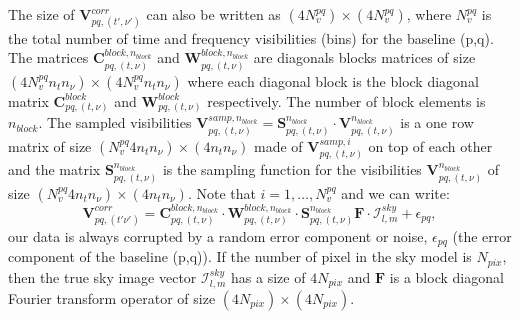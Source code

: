 \documentclass[useAMS,usenatbib]{mn2e}
\begin{document}
The size of 
$\mathbf{V}_{pq,(t',\nu')}^{corr}$ can also be written as $(4N_v^{pq})\times (4N_v^{pq})$, where $N_v^{pq}$ is the total
number of time and frequency visibilities (bins) for the baseline (p,q). The matrices
$\mathbf{C}_{pq,(t,\nu)}^{block,n_{block}}$ and $\mathbf{W}_{pq,(t,\nu)}^{block,n_{block}}$ are diagonals blocks 
matrices of size $(4N_v^{pq}n_t n_{\nu})\times (4N_v^{pq}n_t n_{\nu})$ where each diagonal block is the block diagonal matrix  
$\mathbf{C}_{pq,(t,\nu)}^{block}$ and $\mathbf{W}_{pq,(t,\nu)}^{block}$ respectively. The number of block elements is $n_{block}$. The 
sampled  visibilities 
$\textbf{V}_{pq,(t,\nu)}^{samp,n_{block}}=\mathcal{\textbf{S}}_{pq,(t,\nu)}^{n_{block}}\cdot\mathbf{V}_{pq,(t,\nu)}^{n_{block}}$ is a one 
row matrix of size 
$(N_v^{pq}4 n_t n_{\nu})\times (4 n_t n_{\nu})$ made of $\textbf{V}_{pq,(t,\nu)}^{samp,i}$ on top of each other and the matrix 
$\mathcal{\textbf{S}}_{pq,(t,\nu)}^{n_{block}}$ is the sampling function for the visibilities $\mathbf{V}_{pq,(t,\nu)}^{n_{block}}$ of 
size $(N_v^{pq}4 n_t n_{\nu})\times (4 n_t n_{\nu})$. Note that $i=1,\dots, N_v^{pq}$ and we can write:
\begin{equation}
\mathbf{V}_{pq,(t' \nu')}^{corr}= 
\mathbf{C}_{pq,(t,\nu)}^{block,n_{block}}\cdot\mathbf{W}_{pq,(t,\nu)}^{block,n_{block}}\cdot 
\mathbf{S}_{pq,(t,\nu)}^{n_{block}}\mathbf{F}\cdot\mathcal{I}_{l,m}^{sky }+\epsilon_{pq},\label{eqv:linear}
\end{equation}
our data is always corrupted by a random error component or noise, $\epsilon_{pq}$ (the error component of the baseline (p,q)).
If the number of pixel in the sky model is $N_{pix}$, then the true sky image vector $\mathcal{I}_{l,m}^{sky}$ has a size of $4N_{pix}$ and 
$\textbf{F}$ is a block diagonal Fourier transform operator of size $(4N_{pix})\times(4N_{pix})$.
\end{document}
